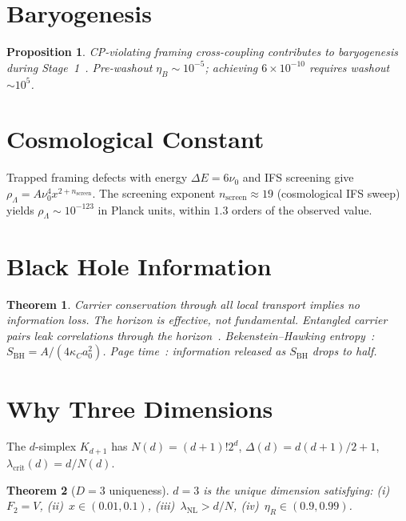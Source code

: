 \documentclass[11pt,twocolumn]{article}
\newtheorem{theorem}{Theorem}
\newtheorem{proposition}{Proposition}
\begin{document}
\section{Baryogenesis}
\label{sec:baryo}

\begin{proposition}
CP-violating framing cross-coupling contributes to baryogenesis during Stage~1~\cite{sakharov1967,kuzmin1985}.
Pre-washout $\eta_B\sim 10^{-5}$; achieving $6\times 10^{-10}$ requires washout $\sim 10^5$.
\end{proposition}

\section{Cosmological Constant}
\label{sec:cc}

Trapped framing defects with energy $\Delta E=6\nu_0$ and IFS screening give $\rho_\Lambda=A\nu_0^4 x^{2+n_{\mathrm{screen}}}$.
The screening exponent $n_{\mathrm{screen}}\approx 19$ (cosmological IFS sweep) yields $\rho_\Lambda\sim 10^{-123}$ in Planck units, within $1.3$ orders of the observed value.

\section{Black Hole Information}
\label{sec:bh}

\begin{theorem}
Carrier conservation through all local transport implies no information loss.
The horizon is effective, not fundamental.
Entangled carrier pairs leak correlations through the horizon~\cite{hawking1975}.
Bekenstein--Hawking entropy~\cite{bekenstein1973}: $S_{\mathrm{BH}}=A/(4\kappa_C a_0^2)$.
Page time~\cite{page1993}: information released as $S_{\mathrm{BH}}$ drops to half.
\end{theorem}


\section{Why Three Dimensions}
\label{sec:d3}

The $d$-simplex $K_{d+1}$ has $N(d)=(d{+}1)!2^d$, $\Delta(d)=d(d{+}1)/2{+}1$, $\lambda_{\mathrm{crit}}(d)=d/N(d)$.

\begin{theorem}[$D=3$ uniqueness]
$d=3$ is the unique dimension satisfying: (i)~$F_2=V$, (ii)~$x\in(0.01,0.1)$, (iii)~$\lambda_{\mathrm{NL}}>d/N$, (iv)~$\eta_R\in(0.9,0.99)$.
\end{theorem}
\end{document}
